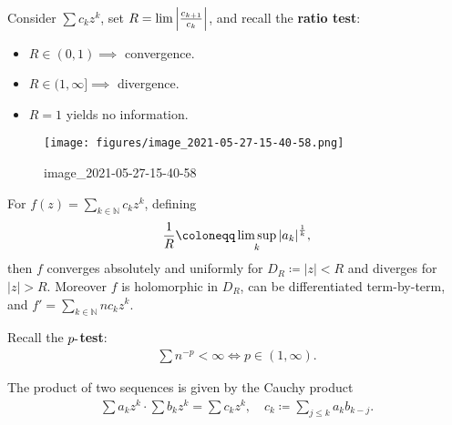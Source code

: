 \begin{proposition}

Consider \(\sum c_k z^k\), set
\(R = \lim {\left\lvert {c_{k+1} \over c_k} \right\rvert}\), and recall
the \textbf{ratio test}:

\begin{itemize}
\tightlist
\item
  \(R\in (0, 1) \implies\) convergence.
\item
  \(R\in (1, \infty] \implies\) divergence.
\item
  \(R=1\) yields no information.
\end{itemize}

\end{proposition}

\begin{proposition}

\begin{figure}
\centering
\texttt{[image: figures/image\_2021-05-27-15-40-58.png]}
\caption{image\_2021-05-27-15-40-58}
\end{figure}

\end{proposition}

\begin{proposition}

For \(f(z) = \sum_{k\in {\mathbb{N}}} c_k z^k\), defining
\begin{align*}
{1\over R} \coloneqq\limsup_{k} {\left\lvert {a_k} \right\rvert}^{1\over k}
,\end{align*}
then \(f\) converges absolutely and uniformly for
\(D_R \coloneqq{\left\lvert {z} \right\rvert} < R\) and diverges for
\({\left\lvert {z} \right\rvert} > R\). Moreover \(f\) is holomorphic in
\(D_R\), can be differentiated term-by-term, and
\(f' = \sum_{k\in {\mathbb{N}}} n c_k z^k\).

\end{proposition}

\begin{fact}

Recall the \textbf{\(p{\hbox{-}}\)test}:
\begin{align*}
\sum n^{-p} < \infty \iff p \in (1, \infty)
.\end{align*}

\end{fact}

\begin{fact}

The product of two sequences is given by the Cauchy product
\begin{align*}
\sum a_kz^k \cdot \sum b_k z^k = \sum c_k z^k,\quad c_k \coloneqq\sum_{j\leq k} a_k b_{k-j}
.\end{align*}

\end{fact}

